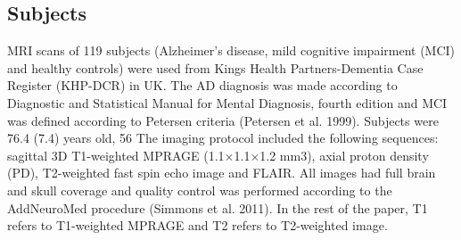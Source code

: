 \subsection{Subjects}
MRI scans of 119 subjects (Alzheimer’s disease, mild cognitive impairment (MCI) and healthy controls) were used from Kings Health Partners-Dementia Case Register (KHP-DCR) in UK. The AD diagnosis was made according to Diagnostic and Statistical Manual for Mental Diagnosis, fourth edition and MCI was defined according to Petersen criteria (Petersen et al. 1999). Subjects were 76.4 (7.4) years old, 56%
The imaging protocol included the following sequences: sagittal 3D T1-weighted MPRAGE (1.1×1.1×1.2 mm3), axial proton density (PD), T2-weighted fast spin echo image and FLAIR. All images had full brain and skull coverage and quality control was performed according to the AddNeuroMed procedure (Simmons et al. 2011). In the rest of the paper, T1 refers to T1-weighted MPRAGE and T2 refers to T2-weighted image.

    